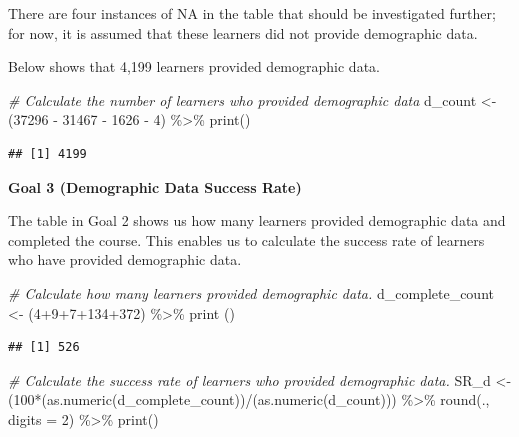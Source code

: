 \documentclass[
]{article}
\newenvironment{Shaded}{\begin{snugshade}}{\end{snugshade}}
\newcommand{\AttributeTok}[1]{\textcolor[rgb]{0.77,0.63,0.00}{#1}}
\newcommand{\CommentTok}[1]{\textcolor[rgb]{0.56,0.35,0.01}{\textit{#1}}}
\newcommand{\DecValTok}[1]{\textcolor[rgb]{0.00,0.00,0.81}{#1}}
\newcommand{\FunctionTok}[1]{\textcolor[rgb]{0.00,0.00,0.00}{#1}}
\newcommand{\NormalTok}[1]{#1}
\newcommand{\OtherTok}[1]{\textcolor[rgb]{0.56,0.35,0.01}{#1}}
\newcommand{\SpecialCharTok}[1]{\textcolor[rgb]{0.00,0.00,0.00}{#1}}
\begin{document}
There are four instances of NA in the table that should be investigated
further; for now, it is assumed that these learners did not provide
demographic data.

Below shows that 4,199 learners provided demographic data.

\begin{Shaded}
\begin{Highlighting}[]
\CommentTok{\# Calculate the number of learners who provided demographic data}
\NormalTok{d\_count }\OtherTok{\textless{}{-}}\NormalTok{ (}\DecValTok{37296} \SpecialCharTok{{-}} \DecValTok{31467} \SpecialCharTok{{-}} \DecValTok{1626} \SpecialCharTok{{-}} \DecValTok{4}\NormalTok{) }\SpecialCharTok{\%\textgreater{}\%}
  \FunctionTok{print}\NormalTok{()}
\end{Highlighting}
\end{Shaded}

\begin{verbatim}
## [1] 4199
\end{verbatim}

\textbf{Goal 3 (Demographic Data Success Rate)}

The table in Goal 2 shows us how many learners provided demographic data
and completed the course. This enables us to calculate the success rate
of learners who have provided demographic data.

\begin{Shaded}
\begin{Highlighting}[]
\CommentTok{\# Calculate how many learners provided demographic data.}
\NormalTok{d\_complete\_count }\OtherTok{\textless{}{-}}\NormalTok{ (}\DecValTok{4}\SpecialCharTok{+}\DecValTok{9}\SpecialCharTok{+}\DecValTok{7}\SpecialCharTok{+}\DecValTok{134}\SpecialCharTok{+}\DecValTok{372}\NormalTok{) }\SpecialCharTok{\%\textgreater{}\%}
  \FunctionTok{print}\NormalTok{ ()}
\end{Highlighting}
\end{Shaded}

\begin{verbatim}
## [1] 526
\end{verbatim}

\begin{Shaded}
\begin{Highlighting}[]
\CommentTok{\# Calculate the success rate of learners who provided demographic data.}
\NormalTok{SR\_d }\OtherTok{\textless{}{-}}\NormalTok{ (}\DecValTok{100}\SpecialCharTok{*}\NormalTok{(}\FunctionTok{as.numeric}\NormalTok{(d\_complete\_count))}\SpecialCharTok{/}\NormalTok{(}\FunctionTok{as.numeric}\NormalTok{(d\_count))) }\SpecialCharTok{\%\textgreater{}\%}
  \FunctionTok{round}\NormalTok{(., }\AttributeTok{digits =} \DecValTok{2}\NormalTok{) }\SpecialCharTok{\%\textgreater{}\%}
  \FunctionTok{print}\NormalTok{()}
\end{Highlighting}
\end{Shaded}
\end{document}
